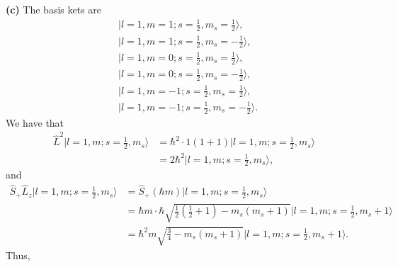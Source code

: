 \documentclass{article}
\begin{document}
\textbf{(c)} 
The basis kets are
\begin{align*}
&|l = 1, m = 1; s = \frac{1}{2}, m_s = \frac{1}{2}\rangle, \\
&|l = 1, m = 1; s = \frac{1}{2}, m_s = -\frac{1}{2}\rangle, \\
&|l = 1, m = 0; s = \frac{1}{2}, m_s = \frac{1}{2}\rangle, \\
&|l = 1, m = 0; s = \frac{1}{2}, m_s = -\frac{1}{2}\rangle, \\
&|l = 1, m = -1; s = \frac{1}{2}, m_s = \frac{1}{2}\rangle, \\
&|l = 1, m = -1; s = \frac{1}{2}, m_s = -\frac{1}{2}\rangle.
\end{align*}
We have that
\begin{align*}
\hat{L}^2 |l = 1, m; s = \frac{1}{2}, m_s\rangle &= \hbar^2 \cdot 1(1+1) |l = 1, m; s = \frac{1}{2}, m_s\rangle \\
&= 2\hbar^2 |l = 1, m; s = \frac{1}{2}, m_s\rangle,
\end{align*}
and
\begin{align*}
\hat{S}_+ \hat{L}_z |l = 1, m; s = \frac{1}{2}, m_s\rangle &= \hat{S}_+ (\hbar m) |l = 1, m; s = \frac{1}{2}, m_s\rangle \\
&= \hbar m \cdot \hbar \sqrt{\frac{1}{2}\left(\frac{1}{2}+1\right) - m_s(m_s + 1)} |l = 1, m; s = \frac{1}{2}, m_s + 1\rangle \\
&= \hbar^2 m \sqrt{\frac{3}{4} - m_s(m_s + 1)} |l = 1, m; s = \frac{1}{2}, m_s + 1\rangle.
\end{align*}
Thus,
\end{document}
